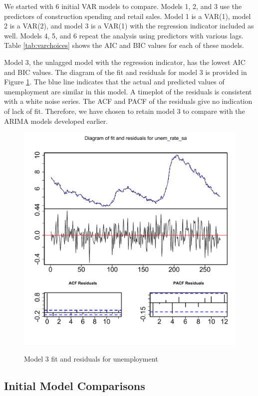 \documentclass[twoside,twocolumn]{article}
\begin{document}
We started  with 6 initial VAR models to compare. Models 1, 2, and 3 use the predictors of construction spending and retail sales. Model 1 is a VAR(1), model 2 is a VAR(2), and model 3 is a VAR(1) with the regression indicator included as well. Models 4, 5, and 6 repeat the analysis using predictors with various lags. Table \ref{tab:varchoices} shows the AIC and BIC values for each of these models.

Model 3, the unlagged model with the regression indicator, has the lowest AIC and BIC values.  The diagram of the fit and residuals for model 3 is provided in Figure \ref{fig:varfitmodel3}. The blue line indicates that the actual and predicted values of unemployment are similar in this model. A timeplot of the residuals is consistent with a white noise series. The ACF and PACF of the residuals give no indication of lack of fit. Therefore, we have chosen to retain model 3 to compare with the ARIMA models developed earlier.


   \begin{figure}[htb]
    	\centering
     	\caption{Model 3 fit and residuals for unemployment}
     	\includegraphics[width=\linewidth]{images/varfitmodel3}
     	\label{fig:varfitmodel3}
 \end{figure}

\subsection{Initial Model Comparisons}
\end{document}
